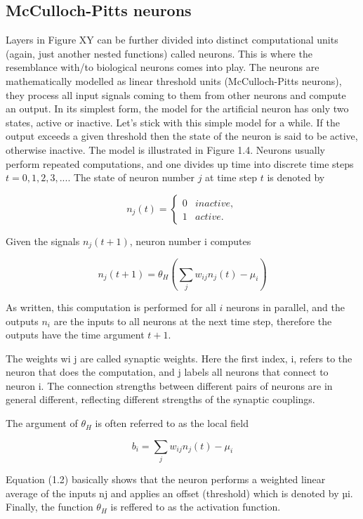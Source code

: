 \subsection{McCulloch-Pitts neurons}

Layers in Figure XY can be further divided into distinct computational units (again, just another nested functions) called neurons. This is where the resemblance with/to biological neurons comes into play. The neurons are mathematically modelled as linear threshold units (McCulloch-Pitts neurons), they process all input signals coming to them from other neurons and compute an output. In its simplest form, the model for the artificial neuron has only two states, active or inactive. Let's stick with this simple model for a while. If the output exceeds a given threshold then the state of the neuron is said to be active, otherwise inactive. The model is illustrated in Figure 1.4. Neurons usually perform repeated computations, and one divides up time into discrete time steps $ t = 0,1,2,3,.... $ The state of neuron number $ j $ at time step $ t $ is denoted by

$$ 
n_j(t) = 
	\begin{cases}	
		0 & inactive,\\
		1 & active.
	\end{cases} 
$$

Given the signals $ n_j(t+1) $, neuron number i computes

$$  
n_j(t+1)=\theta_H \left(\sum\limits_{j}w_{ij}n_j(t) - \mu_i \right)
$$

As written, this computation is performed for all $ i $ neurons in parallel, and the outputs $ n_i $ are the inputs to all neurons at the next time step, therefore the outputs have the time argument $ t+1 $.

The weights wi j are called synaptic weights. Here the first index, i,
refers to the neuron that does the computation, and j labels all neurons that connect
to neuron i. The connection strengths between different pairs of neurons are in
general different, reflecting different strengths of the synaptic couplings.

The argument of $ \theta_H $ is often referred to as the local field

$$ b_i = \sum\limits_{j}w_{ij}n_j(t) - \mu_i $$

Equation (1.2) basically shows that the neuron performs a weighted linear average of the inputs nj and applies an offset (threshold) which is denoted by µi. Finally, the function $ \theta_H $ is reffered to as the activation function.

